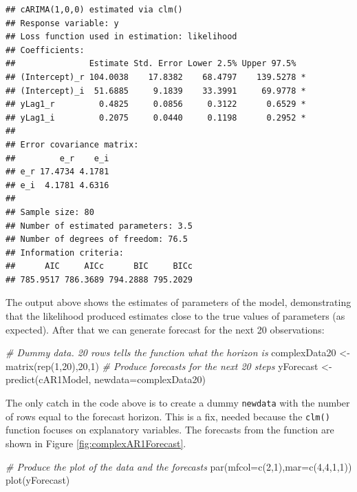 \documentclass[
]{book}
\newenvironment{Shaded}{\begin{snugshade}}{\end{snugshade}}
\newcommand{\AttributeTok}[1]{\textcolor[rgb]{0.77,0.63,0.00}{#1}}
\newcommand{\CommentTok}[1]{\textcolor[rgb]{0.56,0.35,0.01}{\textit{#1}}}
\newcommand{\DecValTok}[1]{\textcolor[rgb]{0.00,0.00,0.81}{#1}}
\newcommand{\FunctionTok}[1]{\textcolor[rgb]{0.00,0.00,0.00}{#1}}
\newcommand{\NormalTok}[1]{#1}
\newcommand{\OtherTok}[1]{\textcolor[rgb]{0.56,0.35,0.01}{#1}}
\begin{document}
\begin{verbatim}
## cARIMA(1,0,0) estimated via clm()
## Response variable: y
## Loss function used in estimation: likelihood
## Coefficients:
##               Estimate Std. Error Lower 2.5% Upper 97.5%  
## (Intercept)_r 104.0038    17.8382    68.4797    139.5278 *
## (Intercept)_i  51.6885     9.1839    33.3991     69.9778 *
## yLag1_r         0.4825     0.0856     0.3122      0.6529 *
## yLag1_i         0.2075     0.0440     0.1198      0.2952 *
## 
## Error covariance matrix:
##         e_r    e_i
## e_r 17.4734 4.1781
## e_i  4.1781 4.6316
## 
## Sample size: 80
## Number of estimated parameters: 3.5
## Number of degrees of freedom: 76.5
## Information criteria:
##      AIC     AICc      BIC     BICc 
## 785.9517 786.3689 794.2888 795.2029
\end{verbatim}

The output above shows the estimates of parameters of the model, demonstrating that the likelihood produced estimates close to the true values of parameters (as expected). After that we can generate forecast for the next 20 observations:

\begin{Shaded}
\begin{Highlighting}[]
\CommentTok{\# Dummy data. 20 rows tells the function what the horizon is}
\NormalTok{complexData20 }\OtherTok{\textless{}{-}} \FunctionTok{matrix}\NormalTok{(}\FunctionTok{rep}\NormalTok{(}\DecValTok{1}\NormalTok{,}\DecValTok{20}\NormalTok{),}\DecValTok{20}\NormalTok{,}\DecValTok{1}\NormalTok{)}
\CommentTok{\# Produce forecasts for the next 20 steps}
\NormalTok{yForecast }\OtherTok{\textless{}{-}} \FunctionTok{predict}\NormalTok{(cAR1Model, }\AttributeTok{newdata=}\NormalTok{complexData20)}
\end{Highlighting}
\end{Shaded}

The only catch in the code above is to create a dummy \texttt{newdata} with the number of rows equal to the forecast horizon. This is a fix, needed because the \texttt{clm()} function focuses on explanatory variables. The forecasts from the function are shown in Figure \ref{fig:complexAR1Forecast}.

\begin{Shaded}
\begin{Highlighting}[]
\CommentTok{\# Produce the plot of the data and the forecasts}
\FunctionTok{par}\NormalTok{(}\AttributeTok{mfcol=}\FunctionTok{c}\NormalTok{(}\DecValTok{2}\NormalTok{,}\DecValTok{1}\NormalTok{),}\AttributeTok{mar=}\FunctionTok{c}\NormalTok{(}\DecValTok{4}\NormalTok{,}\DecValTok{4}\NormalTok{,}\DecValTok{1}\NormalTok{,}\DecValTok{1}\NormalTok{))}
\FunctionTok{plot}\NormalTok{(yForecast)}
\end{Highlighting}
\end{Shaded}
\end{document}
